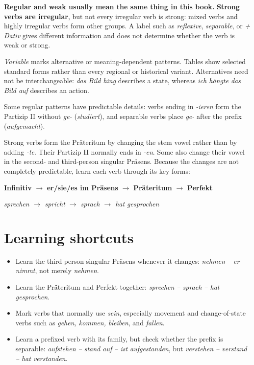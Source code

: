 \begin{tcolorbox}[
  colback=referenceYellowBg,
  colframe=genderPlural,
  title={How to read the labels in the verb tables},
  fonttitle=\bfseries
]
\textbf{Regular and weak usually mean the same thing in this book.}
\textbf{Strong verbs are irregular}, but not every irregular verb is strong:
mixed verbs and highly irregular verbs form other groups. A label such as
\textit{reflexive}, \textit{separable}, or \textit{+ Dativ} gives different
information and does not determine whether the verb is weak or strong.

\textit{Variable} marks alternative or meaning-dependent patterns. Tables
show selected standard forms rather than every regional or historical
variant. Alternatives need not be interchangeable: \textit{das Bild hing}
describes a state, whereas \textit{ich hängte das Bild auf} describes an action.

Some regular patterns have predictable details: verbs ending in
\textit{-ieren} form the Partizip II without \textit{ge-}
(\textit{studiert}), and separable verbs place \textit{ge-} after the prefix
(\textit{aufgemacht}).
\end{tcolorbox}

Strong verbs form the Präteritum by changing the stem vowel rather than by
adding \textit{-te}. Their Partizip II normally ends in \textit{-en}. Some also
change their vowel in the second- and third-person singular Präsens. Because
the changes are not completely predictable, learn each verb through its key
forms:

\begin{tcolorbox}[
  colback=referenceBlueBg,
  colframe=genderMasculine,
  title={Recommended learning pattern},
  fonttitle=\bfseries
]
\centering
\textbf{Infinitiv} $\longrightarrow$ \textbf{er/sie/es im Präsens}
$\longrightarrow$ \textbf{Präteritum} $\longrightarrow$ \textbf{Perfekt}

\medskip
\textit{sprechen $\longrightarrow$ spricht $\longrightarrow$ sprach
$\longrightarrow$ hat gesprochen}
\end{tcolorbox}

\section{Learning shortcuts}

\begin{itemize}[leftmargin=*]
  \item Learn the third-person singular Präsens whenever it changes:
        \textit{nehmen -- er nimmt}, not merely \textit{nehmen}.
  \item Learn the Präteritum and Perfekt together:
        \textit{sprechen -- sprach -- hat gesprochen}.
  \item Mark verbs that normally use \textit{sein}, especially movement and
        change-of-state verbs such as \textit{gehen, kommen, bleiben}, and
        \textit{fallen}.
  \item Learn a prefixed verb with its family, but check whether the prefix is
        separable: \textit{aufstehen -- stand auf -- ist aufgestanden}, but
        \textit{verstehen -- verstand -- hat verstanden}.
\end{itemize}

